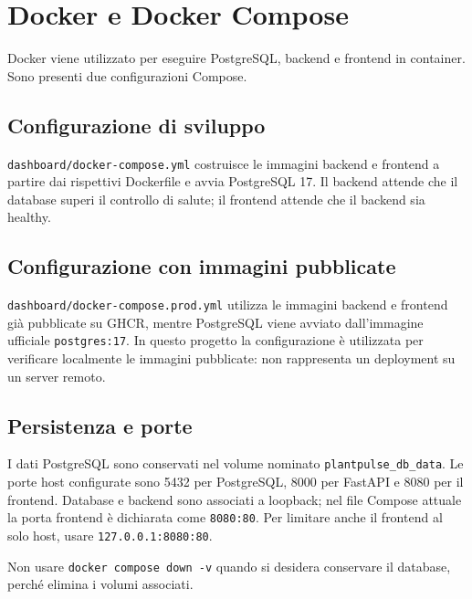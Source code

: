 \chapter{Docker e Docker Compose}

Docker viene utilizzato per eseguire PostgreSQL, backend e frontend in container. Sono presenti due configurazioni Compose.

\section{Configurazione di sviluppo}
\texttt{dashboard/docker-compose.yml} costruisce le immagini backend e frontend a partire dai rispettivi Dockerfile e avvia PostgreSQL 17. Il backend attende che il database superi il controllo di salute; il frontend attende che il backend sia healthy.

\section{Configurazione con immagini pubblicate}
\texttt{dashboard/docker-compose.prod.yml} utilizza le immagini backend e frontend già pubblicate su GHCR, mentre PostgreSQL viene avviato dall'immagine ufficiale \texttt{postgres:17}. In questo progetto la configurazione è utilizzata per verificare localmente le immagini pubblicate: non rappresenta un deployment su un server remoto.

\section{Persistenza e porte}
I dati PostgreSQL sono conservati nel volume nominato \texttt{plantpulse\_db\_data}. Le porte host configurate sono 5432 per PostgreSQL, 8000 per FastAPI e 8080 per il frontend. Database e backend sono associati a loopback; nel file Compose attuale la porta frontend è dichiarata come \texttt{8080:80}. Per limitare anche il frontend al solo host, usare \texttt{127.0.0.1:8080:80}.

Non usare \texttt{docker compose down -v} quando si desidera conservare il database, perché elimina i volumi associati.
